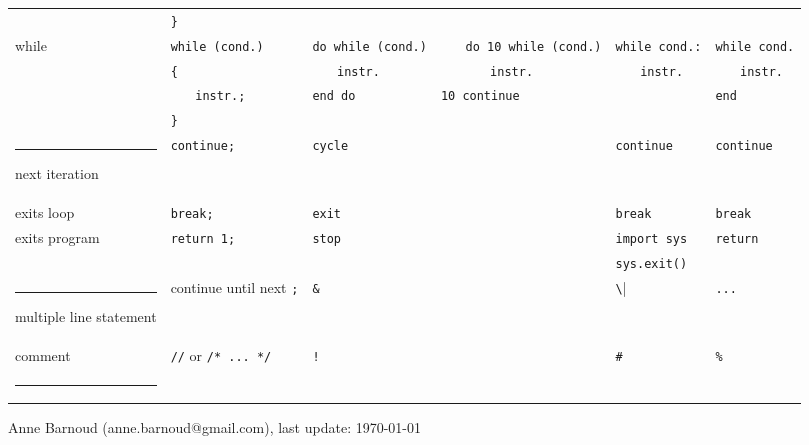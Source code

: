 \documentclass[a3paper,10pt,portrait]{article}
\makeatletter
\def\hlinewd#1{%
\noalign{\ifnum0=`}\fi\hrule \@height #1 %
\futurelet\reserved@a\@xhline}
\newcommand{\hhline}{\hlinewd{1pt}}	%
\renewcommand{\hline}{\hlinewd{0.1pt}}	%
\newcommand{\incr}{$\phantom{mm}$}
\makeatother
\begin{document}
\begin{center}
\begin{tabular}{p{4cm} p{4cm} p{4cm} p{4cm} p{4cm} p{4cm}}
			& \verb|}| 			& \verb|| 		& \verb|| 			& \verb|| 			& \verb||		\\
while & \verb|while (cond.)|	& \verb|do while (cond.)|	& \incr\verb|do 10 while (cond.)| & \verb|while cond.:| & \verb|while cond.| \\
& \verb|{| 			& \incr\verb|instr.| 		& \incr\incr\verb|instr.| & \incr\verb|instr.|& \incr\verb|instr.| \\
& \incr\verb|instr.;| 		& \verb|end do| 		& \verb|10 continue| & & \verb|end| \\
& \verb|}| 			& 				& & & \\
\hline
%
next iteration	& \verb|continue;|	& \verb|cycle| & \verb|| 		& \verb|continue| 	& \verb|continue| 	\\
exits loop		& \verb|break;|		& \verb|exit| & \verb|| 		& \verb|break| 		& \verb|break| 	\\	
exits program	& \verb|return 1;|	& \verb|stop| & \verb|| 		& \verb|import sys| & \verb|return|	\\
& & & & \verb|sys.exit()| & \\
\hline
%
multiple line statement	& continue until next \verb|;|	& \verb|&| & \verb|| 		& \verb|\| 		& \verb|...| 		\\
comment & \verb|//| or \verb|/* ... */| & \verb|!| & & \verb|#| & \verb|%| \\
\hhline
\end{tabular}
\end{center}

\vfill
Anne Barnoud (anne.barnoud@gmail.com), last update: \today
\end{document}
